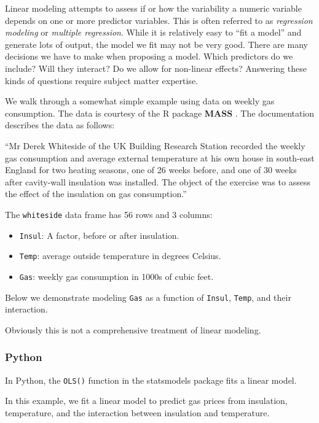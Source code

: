 \documentclass[
]{book}
\providecommand{\tightlist}{%
  \setlength{\itemsep}{0pt}\setlength{\parskip}{0pt}}
\begin{document}
Linear modeling attempts to assess if or how the variability a numeric variable depends on one or more predictor variables. This is often referred to as \emph{regression modeling} or \emph{multiple regression}. While it is relatively easy to ``fit a model'' and generate lots of output, the model we fit may not be very good. There are many decisions we have to make when proposing a model. Which predictors do we include? Will they interact? Do we allow for non-linear effects? Answering these kinds of questions require subject matter expertise.

We walk through a somewhat simple example using data on weekly gas consumption. The data is courtesy of the R package \textbf{MASS} \citep{MASS}. The documentation describes the data as follows:

``Mr Derek Whiteside of the UK Building Research Station recorded the weekly gas consumption and average external temperature at his own house in south-east England for two heating seasons, one of 26 weeks before, and one of 30 weeks after cavity-wall insulation was installed. The object of the exercise was to assess the effect of the insulation on gas consumption.''

The \texttt{whiteside} data frame has 56 rows and 3 columns:

\begin{itemize}
\tightlist
\item
  \texttt{Insul}: A factor, before or after insulation.
\item
  \texttt{Temp}: average outside temperature in degrees Celsius.
\item
  \texttt{Gas}: weekly gas consumption in 1000s of cubic feet.
\end{itemize}

Below we demonstrate modeling \texttt{Gas} as a function of \texttt{Insul}, \texttt{Temp}, and their interaction.

Obviously this is not a comprehensive treatment of linear modeling.

\hypertarget{python-49}{%
\subsubsection*{Python}\label{python-49}}

In Python, the \texttt{OLS()} function in the statsmodels package fits a linear model.

In this example, we fit a linear model to predict gas prices from insulation, temperature, and the interaction between insulation and temperature.
\end{document}
